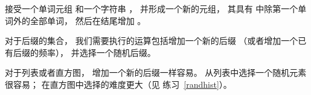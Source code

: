 
 接受一个单词元组  和一个字符串  ， 
并形成一个新的元组， 其具有  中除第一个单词外的全部单词， 
然后在结尾增加  。  


对于后缀的集合， 我们需要执行的运算包括增加一个新的后缀
（或者增加一个已有后缀的频率）， 并选择一个随机后缀。  


对于列表或者直方图， 增加一个新的后缀一样容易。  
从列表中选择一个随机元素很容易；
在直方图中选择的难度更大（见 练习~\ref{randhist}）。  


